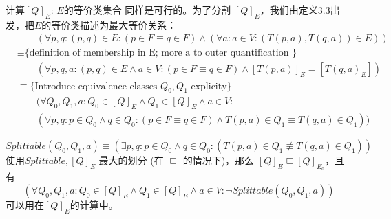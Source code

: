 计算$[Q]_E$: $E$的等价类集合 同样是可行的。为了分割 $[Q]_E$，我们由定义3.3出发，把$E$的等价类描述为最大等价关系：
\begin{equation*}
    \begin{split}
        & \mbox{　　}(\forall p,q : (p,q) \in E : ( p \in F \equiv q \in F ) \land ( \forall a:a \in V : (T(p,a),T(q,a)) \in E )) \\
        & \equiv \mbox{\{ definition of membership in E; more a to outer quantification \} }\\
        & \mbox{　　}(\forall p,q,a:(p,q)\in E \land a\in V : (p \in F \equiv q \in F) \land [T(p,a)]_E = [T(q,a)_E]) \\
        & \equiv \mbox{\{ Introduce equivalence classes } Q_0,Q_1\mbox{ explicity\} } \\
        & \mbox{　　}(\forall Q_0,Q_1,a:Q_0\in [Q]_E \land Q_1 \in [Q]_E \land a \in V : \\
        & \mbox{　　}(\forall p,q:p\in Q_0 \land q\in Q_0 : (p \in F \equiv q \in F) \land T(p,a) \in Q_1 \equiv T(q,a) \in Q_1))
    \end{split}
\end{equation*}
\newline

$$ Splittable(Q_0,Q_1,a) \equiv (\exists p,q:p\in Q_0 \land q\in Q_0 : (T(p,a) \in Q_1 \not\equiv T(q,a) \in Q_1)) $$
使用$Splittable,[Q]_E$ 最大的划分 (在 $\sqsubseteq$ 的情况下)，那么 $[Q]_E \sqsubseteq [Q]_{E_0}$，且有
$$ (\forall Q_0,Q_1,a:Q_0 \in [Q]_E \land Q_1 \in [Q]_E \land a \in V : \neg Splittable(Q_0,Q_1,a)) $$
可以用在$[Q]_E$的计算中。